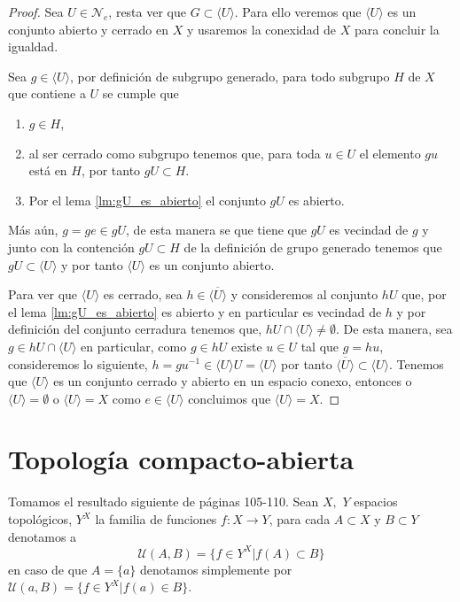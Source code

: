 \begin{proof}
Sea $U \in \mathcal{N}_e$, resta ver que $G \subset \langle U \rangle$. Para ello veremos que $\langle U \rangle$ es un conjunto abierto y cerrado en $X$ y usaremos la conexidad de $X$ para concluir la igualdad.

 Sea $g \in \langle U \rangle$, por definición de subgrupo generado, para todo subgrupo $H$ de $X$ que contiene a $U$ se cumple  que 
 
\begin{enumerate}
	\item $g \in H$,
	\item al ser cerrado como subgrupo tenemos que, para toda $u \in U$ el elemento $gu$ está en $H$, por tanto $gU \subset H$.
 
 \item Por el lema \ref{lm:gU_es_abierto} el conjunto $gU$ es abierto.
\end{enumerate} 
 
 
Más aún, $g=ge \in gU$, de esta manera se que tiene que  $gU$ es vecindad de $g$ y junto con la contención $gU \subset H$ de la definición de grupo generado tenemos que  $gU \subset \langle U \rangle$ y por tanto $\langle U \rangle$ es un conjunto abierto.

Para ver que $\langle U \rangle$ es cerrado, sea $h \in \overline{\langle U \rangle}$ y consideremos al conjunto $hU$ que, por el lema \ref{lm:gU_es_abierto} es abierto y en particular es vecindad de $h$ y por definición del conjunto cerradura tenemos que, $hU \cap \langle U \rangle \neq \emptyset.$ De esta manera, sea $g \in hU\cap \langle U \rangle$ en particular, como $g \in hU$ existe $u \in U$ tal que $g=hu$, consideremos lo siguiente, $h=gu^{-1} \in  \langle U \rangle U =\langle U \rangle$ por tanto $\overline{\langle U \rangle} \subset \langle U \rangle.$ Tenemos que $\langle U \rangle$ es un conjunto cerrado y abierto en un espacio conexo, entonces o $\langle U \rangle=\emptyset$ o $\langle U \rangle=X$ como $e \in \langle U \rangle$ concluimos que $\langle U \rangle = X.$
\end{proof}

\section*{Topología compacto-abierta}	
Tomamos el resultado siguiente de \cite{top_juan} páginas 105-110. Sean $X,$ $Y$ espacios topológicos, $Y^X$ la familia de funciones $f:X \to Y$, para cada $A \subset X$ y $B \subset Y$ denotamos a $$\mathcal{U}(A,B)=\{f \in Y^X|f(A)\subset B \}$$ en caso de que $A=\{a\}$ denotamos  simplemente por $\mathcal{U}(a,B)=\{f \in Y^X|f(a) \in B\}$.

